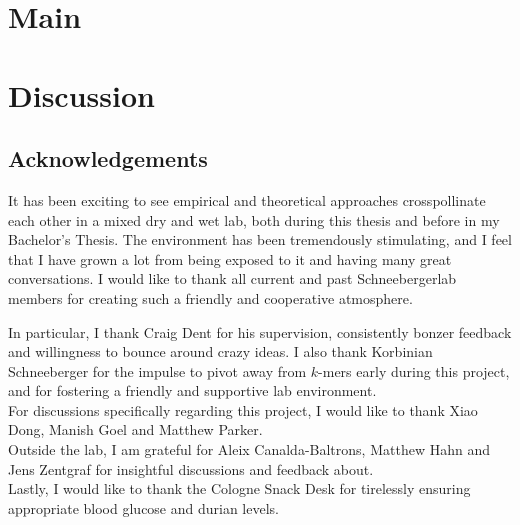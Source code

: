 \documentclass[12pt, twoside, a4paper]{report}
\begin{document}
\chapter*{Main}


%
%
\chapter*{Discussion}


\vfill


\section*{Acknowledgements}

It has been exciting to see empirical and theoretical approaches crosspollinate each other in a mixed dry and wet lab, both during this thesis and before in my Bachelor's Thesis.
The environment has been tremendously stimulating, and I feel that I have grown a lot from being exposed to it and having many great conversations.
I would like to thank all current and past Schneebergerlab members for creating such a friendly and cooperative atmosphere.

In particular, I thank Craig Dent for his supervision, consistently bonzer feedback and willingness to bounce around crazy ideas. %
I also thank Korbinian Schneeberger for the impulse to pivot away from $k$-mers early during this project, and for fostering a friendly and supportive lab environment.\\
For discussions specifically regarding this project, I would like to thank Xiao Dong, Manish Goel and Matthew Parker.\\
Outside the lab, I am grateful for Aleix Canalda-Baltrons, Matthew Hahn and Jens Zentgraf for insightful discussions and feedback about.\\
Lastly, I would like to thank the Cologne Snack Desk for tirelessly ensuring appropriate blood glucose and durian levels.

\end{document}
